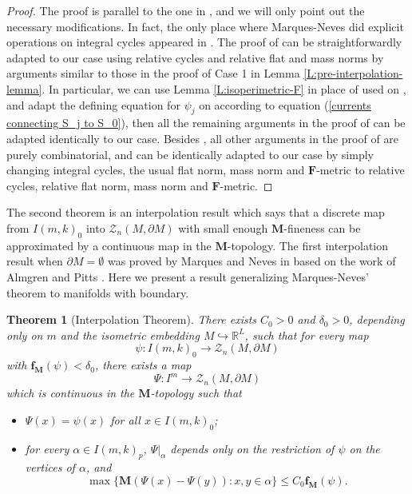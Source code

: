 \documentclass[10pt]{amsart}
\newtheorem{theorem}{Theorem}[section]
\theoremstyle{definition}
\theoremstyle{remark}
\numberwithin{equation}{section}
\newcommand{\al}{\alpha}
\newcommand{\R}{\mathbb{R}}
\newcommand{\de}{\delta}
\newcommand{\Z}{\mathcal{Z}}
\newcommand{\f}{\mathbf{f}}
\newcommand{\M}{\mathbf{M}}
\newcommand{\mF}{\mathbf{F}}
\newcommand{\rom}[1]{\expandafter\romannumeral #1}
\begin{document}
\begin{proof}
The proof is parallel to the one in \cite[Theorem 13.1]{Marques-Neves14}, and we will only point out the necessary modifications. In fact, the only place where Marques-Neves did explicit operations on integral cycles appeared in \cite[Lemma 13.4]{Marques-Neves14}. 
The proof of \cite[Lemma 13.4]{Marques-Neves14} can be straightforwardly adapted to our case using relative cycles and relative flat and mass norms by arguments similar to those in the proof of Case 1 in Lemma \ref{L:pre-interpolation-lemma}. In particular, we can use Lemma \ref{L:isoperimetric-F} in place of \cite[Corollary 1.14]{Almgren62} used on \cite[page 748]{Marques-Neves14}, and adapt the defining equation for $\psi_j$ on \cite[page 749]{Marques-Neves14} according to equation (\ref{currents connecting S_j to S_0}), then all the remaining arguments in the proof of \cite[Lemma 13.4]{Marques-Neves14} can be adapted identically to our case. Besides \cite[Lemma 13.4]{Marques-Neves14}, all other arguments in the proof of \cite[Theorem 13.1]{Marques-Neves14} are purely combinatorial, and can be identically adapted to our case by simply changing integral cycles, the usual flat norm, mass norm and $\mF$-metric to relative cycles, relative flat norm, mass norm and $\mF$-metric.
\end{proof}

The second theorem is an interpolation result which says that a discrete map from $I(m, k)_0$ into $\Z_n(M, \partial M)$ with small enough $\M$-fineness can be approximated by a continuous map in the $\M$-topology. The first interpolation result when $\partial M=\emptyset$ was proved by Marques and Neves in \cite[Theorem 14.1]{Marques-Neves14} \cite[Theorem 3.10]{Marques-Neves17} based on the work of Almgren \cite{Almgren62} and Pitts \cite{Pitts}. Here we present a result generalizing Marques-Neves' theorem to manifolds with boundary.

\begin{theorem}[Interpolation Theorem]
\label{T:interpolation}
There exists $C_0>0$ and $\de_0>0$, depending only on $m$ and the isometric embedding $M \hookrightarrow \R^L$, such that for every map
$$\psi: I(m, k)_0\rightarrow \Z_n(M, \partial M)$$
with $\f_\M(\psi)<\de_0$, there exists a map
$$\Psi: I^m\rightarrow \Z_n(M, \partial M)$$
which is continuous in the $\M$-topology such that
\begin{itemize}
\item[$(\rom{1})$] $\Psi(x)=\psi(x)$ for all $x\in I(m, k)_0$;
\item[$(\rom{2})$] for every $\al\in I(m, k)_p$, $\Psi|_{\al}$ depends only on the restriction of $\psi$ on the vertices of $\alpha$, and
\[ \max\{\M(\Psi(x)-\Psi(y)): x, y\in\al\}\leq C_0\f_\M(\psi).\]
\end{itemize}
\end{theorem}
\end{document}
